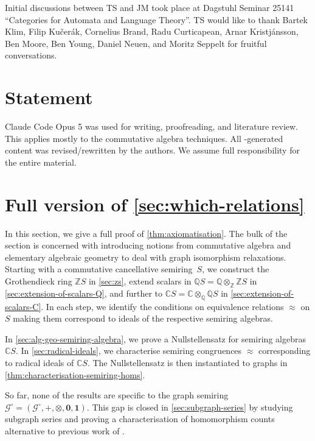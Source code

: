 \documentclass[11pt]{scrartcl}
\theoremstyle{definition}
\theoremstyle{plain}
\theoremstyle{remark}
\newcommand{\lG}{\mathcal{G}^\circ}
\begin{document}
    Initial discussions between TS and JM  took place at   Dagstuhl Seminar 25141 \enquote{Categories for Automata and Language Theory}.
    TS would like to thank Bartek Klim,
	Filip Ku\v{c}er\'ak, Cornelius Brand, Radu Curticapean, Arnar Kristjánsson, Ben Moore, Ben Young, Daniel Neuen, and Moritz Seppelt for fruitful conversations.


    \section*{ Statement}

    Claude Code Opus 5 was used for writing, proofreading, and literature review. This applies mostly to the commutative algebra techniques. All -generated content was revised/rewritten by the authors. We assume full responsibility for the entire material.


	\section{Full version of \texorpdfstring{\cref{sec:which-relations}}{Axiomatisation}}
	\label{app:which-relations}

	In this section, we give a full proof of \cref{thm:axiomatisation}.
	The bulk of the section  is concerned with introducing notions from commutative algebra and elementary algebraic geometry to deal with graph isomorphism relaxations.
	Starting with a commutative cancellative semiring~$S$,
	we construct the Grothendieck ring $\mathbb{Z}S$ in \cref{sec:zs},
	extend scalars in $\mathbb{Q}S = \mathbb{Q} \otimes_{\mathbb{Z}} \mathbb{Z}S$ in \cref{sec:extension-of-scalars-Q},
	and further to $\mathbb{C}S = \mathbb{C} \otimes_{\mathbb{Q}} \mathbb{Q}S$ in \cref{sec:extension-of-scalars-C}.
	In each step, we identify the conditions on equivalence relations $\approx$ on $S$ making them correspond to ideals of the respective semiring algebras.
	
	In \cref{sec:alg-geo-semiring-algebra}, we prove a Nullstellensatz for semiring algebras $\mathbb{C}S$.
    In \cref{sec:radical-ideals}, we characterise semiring congruences $\approx$ corresponding to radical ideals of $\mathbb{C}S$.
	The Nullstellensatz is then instantiated to graphs in \cref{thm:characterisation-semiring-homs}.

	So far, none of the results are specific to the graph semiring $\lG = (\lG, +, \otimes, \boldsymbol{0}, \boldsymbol{1})$.
	This gap is closed in \cref{sec:subgraph-series} by studying subgraph series and proving a characterisation of homomorphism counts alternative to previous work of \textcite{lovasz_dual_2010}.
\end{document}
